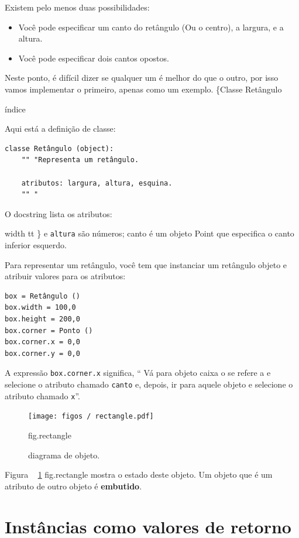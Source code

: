 \documentclass[10pt]{book}
\begin{document}
\begin{v erbatim}
{Existem pelo menos duas possibilidades: 

\begin{itemize}

\item Você pode especificar um canto do retângulo
(Ou o centro), a largura, e a altura.

\item Você pode especificar dois cantos opostos.

\end{itemize}

Neste ponto, é difícil dizer se qualquer um é melhor do que
o outro, por isso vamos implementar o primeiro, apenas como um exemplo.
\{Classe Retângulo} índice

Aqui está a definição de classe:

\begin{verbatim}
classe Retângulo (object):
    "" "Representa um retângulo. 

    atributos: largura, altura, esquina.
    "" "
\end{verbatim}
%
O docstring lista os atributos: {width tt \} e
{\tt altura} são números; {canto \tt} é um objeto Point que
especifica o canto inferior esquerdo.

Para representar um retângulo, você tem que instanciar um retângulo
objeto e atribuir valores para os atributos:

\begin{verbatim}
box = Retângulo ()
box.width = 100,0
box.height = 200,0
box.corner = Ponto ()
box.corner.x = 0,0
box.corner.y = 0,0
\end{verbatim}
%
A expressão {\tt box.corner.x} significa,
`` Vá para objeto {caixa \tt} o se refere a e selecione o atributo chamado
{\tt canto} e, depois, ir para aquele objeto e selecione o atributo chamado
{\tt x}''.

\begin{figure}
\centerline
{\texttt{[image: figos / rectangle.pdf]}}
\caption{diagrama de objeto.}
\label{} fig.rectangle
\end{figure}


Figura ~ \ref {} fig.rectangle mostra o estado deste objeto.
Um objeto que é um atributo de outro objeto é {\bf embutido}.


\section {Instâncias como valores de retorno}

}
\end{v erbatim}
\end{document}
